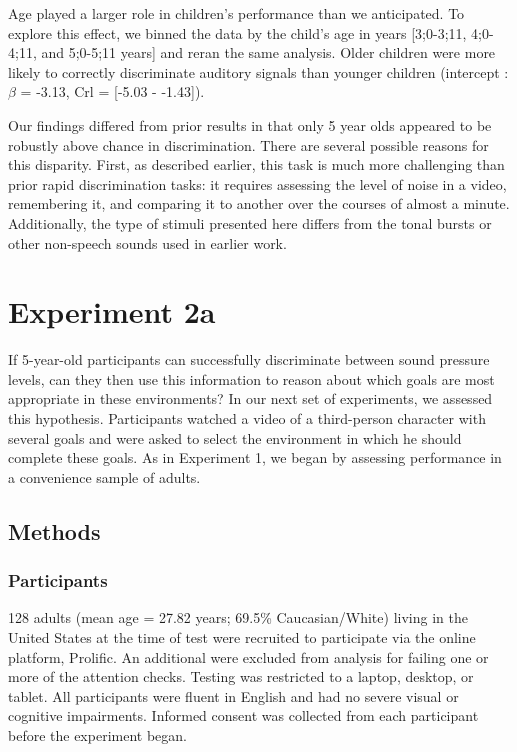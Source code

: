 \documentclass[10pt, letterpaper]{article}
\begin{document}
Age played a larger role in children's performance than we anticipated.
To explore this effect, we binned the data by the child's age in years
{[}3;0-3;11, 4;0-4;11, and 5;0-5;11 years{]} and reran the same
analysis. Older children were more likely to correctly discriminate
auditory signals than younger children (intercept : \(\beta\) = -3.13,
Crl = {[}-5.03 - -1.43{]}).

Our findings differed from prior results in that only 5 year olds
appeared to be robustly above chance in discrimination. There are
several possible reasons for this disparity. First, as described
earlier, this task is much more challenging than prior rapid
discrimination tasks: it requires assessing the level of noise in a
video, remembering it, and comparing it to another over the courses of
almost a minute. Additionally, the type of stimuli presented here
differs from the tonal bursts or other non-speech sounds used in earlier
work.

\hypertarget{experiment-2a}{%
\section{Experiment 2a}\label{experiment-2a}}

If 5-year-old participants can successfully discriminate between sound
pressure levels, can they then use this information to reason about
which goals are most appropriate in these environments? In our next set
of experiments, we assessed this hypothesis. Participants watched a
video of a third-person character with several goals and were asked to
select the environment in which he should complete these goals. As in
Experiment 1, we began by assessing performance in a convenience sample
of adults.

\hypertarget{methods-2}{%
\subsection{Methods}\label{methods-2}}

\hypertarget{participants-2}{%
\subsubsection{Participants}\label{participants-2}}

128 adults (mean age = 27.82 years; 69.5\% Caucasian/White) living in
the United States at the time of test were recruited to participate via
the online platform, Prolific. An additional were excluded from analysis
for failing one or more of the attention checks. Testing was restricted
to a laptop, desktop, or tablet. All participants were fluent in English
and had no severe visual or cognitive impairments. Informed consent was
collected from each participant before the experiment began.
\end{document}
